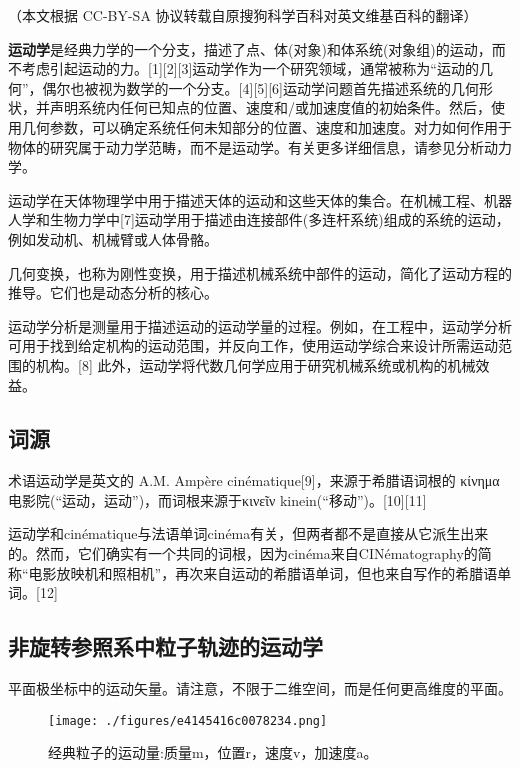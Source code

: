 
（本文根据 CC-BY-SA 协议转载自原搜狗科学百科对英文维基百科的翻译）

\textbf{运动学}是经典力学的一个分支，描述了点、体(对象)和体系统(对象组)的运动，而不考虑引起运动的力。[1][2][3]运动学作为一个研究领域，通常被称为“运动的几何”，偶尔也被视为数学的一个分支。[4][5][6]运动学问题首先描述系统的几何形状，并声明系统内任何已知点的位置、速度和/或加速度值的初始条件。然后，使用几何参数，可以确定系统任何未知部分的位置、速度和加速度。对力如何作用于物体的研究属于动力学范畴，而不是运动学。有关更多详细信息，请参见分析动力学。

运动学在天体物理学中用于描述天体的运动和这些天体的集合。在机械工程、机器人学和生物力学中[7]运动学用于描述由连接部件(多连杆系统)组成的系统的运动，例如发动机、机械臂或人体骨骼。

几何变换，也称为刚性变换，用于描述机械系统中部件的运动，简化了运动方程的推导。它们也是动态分析的核心。

运动学分析是测量用于描述运动的运动学量的过程。例如，在工程中，运动学分析可用于找到给定机构的运动范围，并反向工作，使用运动学综合来设计所需运动范围的机构。[8] 此外，运动学将代数几何学应用于研究机械系统或机构的机械效益。

\subsection{词源}

术语运动学是英文的 A.M. Ampère cinématique[9]，来源于希腊语词根的 κίνημα 电影院(“运动，运动”)，而词根来源于κινεῖν kinein(“移动”)。[10][11]

运动学和cinématique与法语单词cinéma有关，但两者都不是直接从它派生出来的。然而，它们确实有一个共同的词根，因为cinéma来自CINématography的简称“电影放映机和照相机”，再次来自运动的希腊语单词，但也来自写作的希腊语单词。[12]

\subsection{非旋转参照系中粒子轨迹的运动学}

平面极坐标中的运动矢量。请注意，不限于二维空间，而是任何更高维度的平面。

\begin{figure}[ht]
\centering
\texttt{[image: ./figures/e4145416c0078234.png]}
\caption{经典粒子的运动量:质量m，位置r，速度v，加速度a。} \label{fig_YDX_3}
\end{figure}

